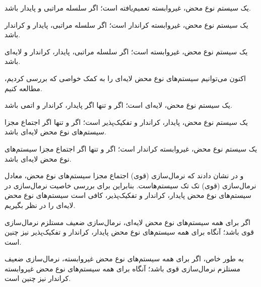 \begin{defn}
یک سیستم نوع محض، غیروابسته تعمیم‌یافته است؛ اگر سلسله مراتبی و پایدار باشد.
\end{defn}

\begin{defn}
یک سیستم نوع محض، غیروابسته کراندار است؛ اگر سلسله مراتبی، پایدار و کراندار باشد.
\end{defn}

\begin{defn}
یک سیستم نوع محض، غیروابسته است؛ اگر سلسله مراتبی، پایدار، کراندار و لایه‌ای باشد.
\end{defn}

اکنون می‌توانیم سیستم‌های نوع محض لایه‌ای را به کمک خواصی که بررسی کردیم، مطالعه کنیم.

\begin{lmm}
یک سیستم نوع محض، لایه‌ای است؛ اگر و تنها اگر پایدار، کراندار و اتمی باشد.
\end{lmm}

\begin{lmm}
یک سیستم نوع محض، پایدار، کراندار و تفکیک‌پذیر است؛ اگر و تنها اگر اجتماع مجزا سیستم‌های نوع محض لایه‌ای باشد.    
\end{lmm}

\begin{cor}
یک سیستم نوع محض، غیروابسته کراندار است؛ اگر و تنها اگر اجتماع مجزا سیستم‌های نوع محض لایه‌ای باشد.
\end{cor}

 و 
در
\cite{roux2014}
نشان دادند که نرمال‌سازی (قوی) اجتماع مجزا سیستم‌های نوع محض، معادل نرمال‌سازی (قوی) تک تک سیستم‌هاست.
بنابراین برای بررسی خاصیت نرمال‌سازی در سیستم‌های نوع محض پایدار، کراندار و تفکیک‌پذیر، کافی است سیستم‌های نوع محض لایه‌ای را در نظر بگیریم.

\begin{prop}
اگر برای همه سیستم‌های نوع محض لایه‌ای، نرمال‌سازی ضعیف مستلزم نرمال‌سازی قوی باشد؛ آنگاه برای همه سیستم‌های نوع محض پایدار، کراندار و تفکیک‌پذیر نیز چنین است.

به طور خاص، اگر برای همه سیستم‌های نوع محض غیروابسته، نرمال‌سازی ضعیف مستلزم نرمال‌سازی قوی باشد؛ آنگاه برای همه سیستم‌های نوع محض غیروابسته کراندار نیز چنین است.
\end{prop}

